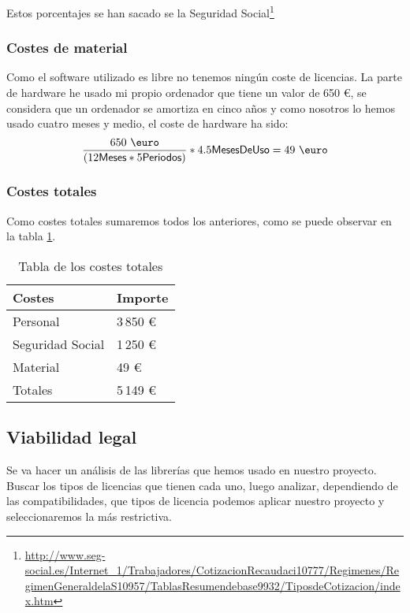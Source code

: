 Estos porcentajes se han sacado se la Seguridad Social\footnote{\url{http://www.seg-social.es/Internet_1/Trabajadores/CotizacionRecaudaci10777/Regimenes/RegimenGeneraldelaS10957/TablasResumendebase9932/TiposdeCotizacion/index.htm}}
\subsubsection{Costes de material}
Como el software utilizado es libre no tenemos ningún coste de licencias. La parte de hardware he usado mi propio ordenador que tiene un valor de 650 \euro, se considera que un ordenador se amortiza en cinco años y como nosotros lo hemos usado cuatro meses y medio, el coste de hardware ha sido:
\[\frac{650~{\mbox{\euro}}}{(12\textsf{Meses}*5\textsf{Periodos})}*4.5\textsf{MesesDeUso}=49~{\mbox{\euro}}\]
\subsubsection{Costes totales}
Como costes totales sumaremos todos los anteriores, como se puede observar en la tabla \ref{tab:costes}.

\begin{table}[]
\centering
\caption{Tabla de los costes totales}
\label{tab:costes}
\begin{tabular}{p{4cm} p{2cm}}
\toprule
Costes & Importe \\ \midrule
Personal         & 3\,850 \euro{}   \\ 
Seguridad Social & 1\,250 \euro{} \\ 
Material         & 49 \euro{}   \\ 
Totales             & 5\,149 \euro{} \\ \bottomrule
\end{tabular}
\end{table}

\subsection{Viabilidad legal}
Se va hacer un análisis de las librerías que hemos usado en nuestro proyecto. Buscar los tipos de licencias que tienen cada uno, luego analizar, dependiendo de las compatibilidades, que tipos de licencia podemos aplicar nuestro proyecto y seleccionaremos la más restrictiva.

